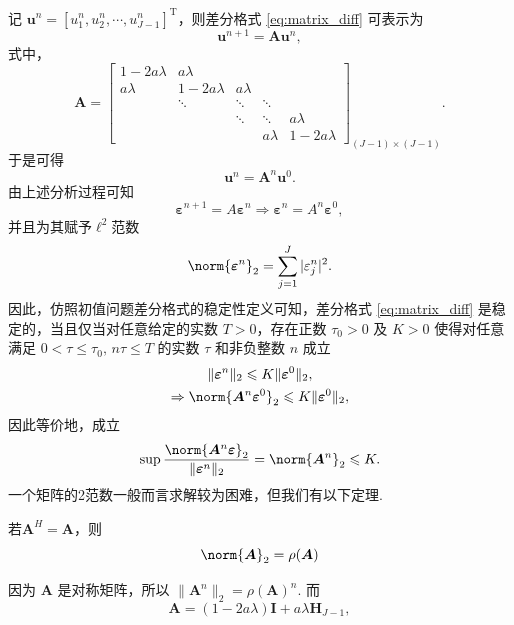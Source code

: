 记 $\bm{u}^n = \left[u_1^n, u_2^n, \cdots, u_{J-1}^n\right]^{\mathrm{T}}$，则差分格式 \eqref{eq:matrix_diff} 可表示为
\begin{equation*}
    \bm{u}^{n+1} = \bm{A}\bm{u}^n,
\end{equation*}
式中，
\begin{equation*}
    \bm{A} = \begin{bmatrix}
        1 - 2a\lambda & a\lambda & & & \\
        a\lambda & 1 - 2a\lambda & a\lambda & & \\
        & \ddots & \ddots & \ddots & \\
        & & \ddots & \ddots & a\lambda \\
        & & & a\lambda & 1 - 2a\lambda
    \end{bmatrix}_{(J-1) \times (J-1)}.
\end{equation*}
于是可得
\begin{equation*}
    \bm{u}^n = \bm{A}^n \bm{u}^0.
\end{equation*}
\noindent{} 由上述分析过程可知
\begin{equation*}
    \bm{\varepsilon}^{n+1}=A\bm{\varepsilon}^n\Rightarrow \bm{\varepsilon}^n = A^n \bm{\varepsilon}^0,
\end{equation*}
并且为其赋予$\ell^2$范数
\begin{equation*}
    \norm{\bm{\varepsilon}^n}_2=\sum_{j=1}^J|\varepsilon_j^n|^2.
\end{equation*}
因此，仿照初值问题差分格式的稳定性定义可知，差分格式 \eqref{eq:matrix_diff} 是稳定的，当且仅当对任意给定的实数 $T > 0$，存在正数 $\tau_0 > 0$ 及 $K > 0$ 使得对任意满足 $0 < \tau \leq \tau_0, \, n\tau \leq T$ 的实数 $\tau$ 和非负整数 $n$ 成立
\begin{gather*}
    \|\bm{\varepsilon}^n\|_2 \leq K \|\bm{\varepsilon}^0\|_2, \\
    \Rightarrow \norm{\bm{A}^n \bm{\varepsilon}^0}_2 \leq K \|\bm{\varepsilon}^0\|_2,
\end{gather*}
因此等价地，成立
\begin{equation}
    \sup\frac{\norm{\bm{A}^n\bm{\varepsilon}}_2}{\|\bm{\varepsilon}^n\|_2}=\norm{\bm{A}^n}_2 \leq K. \label{eq:matrix_norm}
\end{equation}
\noindent{} 一个矩阵的2范数一般而言求解较为困难，但我们有以下定理.
\begin{theorem}[]
    若$\bm{A}^H=\bm{A}$，则
    \begin{equation*}
        \norm{\bm{A}}_2=\rho(\bm{A})
    \end{equation*}
\end{theorem}
因为 $\bm{A}$ 是对称矩阵，所以 $\|\bm{A}^n\|_2 = \rho(\bm{A})^n$. 而
\begin{equation*}
    \bm{A} = (1 - 2a\lambda)\bm{I} + a\lambda \bm{H}_{J-1},
\end{equation*}

